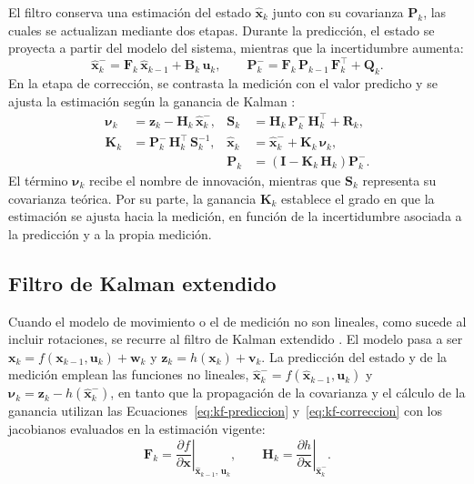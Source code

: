 El filtro conserva una estimación del estado $\hat{\mathbf{x}}_k$ junto con su covarianza $\mathbf{P}_k$, las cuales se actualizan mediante dos etapas.
Durante la predicción, el estado se proyecta a partir del modelo del sistema, mientras que la incertidumbre aumenta:
\begin{equation}
\hat{\mathbf{x}}_k^{-} = \mathbf{F}_k\,\hat{\mathbf{x}}_{k-1} + \mathbf{B}_k\,\mathbf{u}_k,
\qquad
\mathbf{P}_k^{-} = \mathbf{F}_k\,\mathbf{P}_{k-1}\,\mathbf{F}_k^{\top} + \mathbf{Q}_k.
\label{eq:kf-prediccion}
\end{equation}
En la etapa de corrección, se contrasta la medición con el valor predicho y se ajusta la estimación según la ganancia de Kalman \cite{groves2013gnss}:
\begin{equation}
\begin{aligned}
\boldsymbol{\nu}_k &= \mathbf{z}_k - \mathbf{H}_k\,\hat{\mathbf{x}}_k^{-}, &
\mathbf{S}_k &= \mathbf{H}_k\,\mathbf{P}_k^{-}\,\mathbf{H}_k^{\top} + \mathbf{R}_k,\\
\mathbf{K}_k &= \mathbf{P}_k^{-}\,\mathbf{H}_k^{\top}\,\mathbf{S}_k^{-1}, &
\hat{\mathbf{x}}_k &= \hat{\mathbf{x}}_k^{-} + \mathbf{K}_k\,\boldsymbol{\nu}_k,\\
& & \mathbf{P}_k &= \left(\mathbf{I} - \mathbf{K}_k\,\mathbf{H}_k\right)\mathbf{P}_k^{-}.
\end{aligned}
\label{eq:kf-correccion}
\end{equation}
El término $\boldsymbol{\nu}_k$ recibe el nombre de innovación, mientras que $\mathbf{S}_k$ representa su covarianza teórica.
Por su parte, la ganancia $\mathbf{K}_k$ establece el grado en que la estimación se ajusta hacia la medición, en función de la incertidumbre asociada a la predicción y a la propia medición.

\subsection{Filtro de Kalman extendido}

Cuando el modelo de movimiento o el de medición no son lineales, como sucede al incluir rotaciones, se recurre al filtro de Kalman extendido \cite{groves2013gnss}.
El modelo pasa a ser $\mathbf{x}_k = f(\mathbf{x}_{k-1},\mathbf{u}_k) + \mathbf{w}_k$ y $\mathbf{z}_k = h(\mathbf{x}_k) + \mathbf{v}_k$.
La predicción del estado y de la medición emplean las funciones no lineales, $\hat{\mathbf{x}}_k^{-} = f(\hat{\mathbf{x}}_{k-1},\mathbf{u}_k)$ y $\boldsymbol{\nu}_k = \mathbf{z}_k - h(\hat{\mathbf{x}}_k^{-})$, en tanto que la propagación de la covarianza y el cálculo de la ganancia utilizan las Ecuaciones~\eqref{eq:kf-prediccion} y~\eqref{eq:kf-correccion} con los jacobianos evaluados en la estimación vigente:
\begin{equation}
\mathbf{F}_k = \left.\frac{\partial f}{\partial \mathbf{x}}\right|_{\hat{\mathbf{x}}_{k-1},\,\mathbf{u}_k},
\qquad
\mathbf{H}_k = \left.\frac{\partial h}{\partial \mathbf{x}}\right|_{\hat{\mathbf{x}}_k^{-}}.
\label{eq:ekf-jacobianos}
\end{equation}


